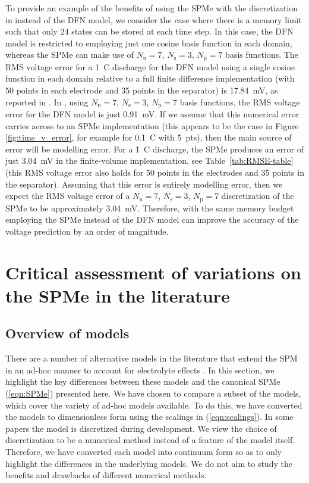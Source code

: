 \documentclass[a4paper]{article}
\newcommand{\ts}[1]{_{\text{#1}}}
\begin{document}
To provide an example of the benefits of using the SPMe with the discretization in \cite{Northrop2011a} instead of the DFN model, we consider the case where there is a memory limit such that only $24$ states can be stored at each time step. In this case, the DFN model is restricted to employing just one cosine basis function in each domain, whereas the SPMe can make use of $N\ts{n}=7$, $N\ts{s}=3$, $N\ts{p}=7$ basis functions. The RMS voltage error for a \SI{1}{C} discharge for the DFN model using a single cosine function in each domain relative to a full finite difference implementation (with 50 points in each electrode and 35 points in the separator) is \SI{17.84}{mV}, as reported in \cite{Northrop2011a}. In \cite{Northrop2011a}, using $N\ts{n}=7$, $N\ts{s}=3$, $N\ts{p}=7$ basis functions, the RMS voltage error for the DFN model is just \SI{0.91}{mV}. If we assume that this numerical error carries across to an SPMe implementation (this appears to be the case in Figure \ref{fig:time_v_error}, for example for \SI{0.1}{C} with \SI{5}{pts}), then the main source of error will be modelling error. For a \SI{1}{C} discharge, the SPMe produces an error of just \SI{3.04}{mV} in the finite-volume implementation, see Table~\ref{tab:RMSE-table} (this RMS voltage error also holds for 50 points in the electrodes and 35 points in the separator). Assuming that this error is entirely modelling error, then we expect the RMS voltage error of a $N\ts{n}=7$, $N\ts{s}=3$, $N\ts{p}=7$ discretization of the SPMe to be approximately \SI{3.04}{mV}. Therefore, with the same memory budget employing the SPMe instead of the DFN model can improve the accuracy of the voltage prediction by an order of magnitude.

\section{Critical assessment of variations on the SPMe in the literature} 
\subsection{Overview of models}
There are a number of alternative models in the literature that extend the SPM in an ad-hoc manner to account for electrolyte effects \cite{kemper2013extended, Perez2016, prada2012simplified, han2015simplification, rahimian2013extension, tanim2015temperature}. In this section, we highlight the key differences between these models and the canonical SPMe (\ref{eqn:SPMe}) presented here. We have chosen to compare a subset of the models, which cover the variety of ad-hoc models available. To do this, we have converted the models to dimensionless form using the scalings in (\ref{eqn:scalings}). In some papers the model is discretized during development. We view the choice of discretization to be a numerical method instead of a feature of the model itself. Therefore, we have converted each model into continuum form so as to only highlight the differences in the underlying models. We do not aim to study the benefits and drawbacks of different numerical methods.
\end{document}
